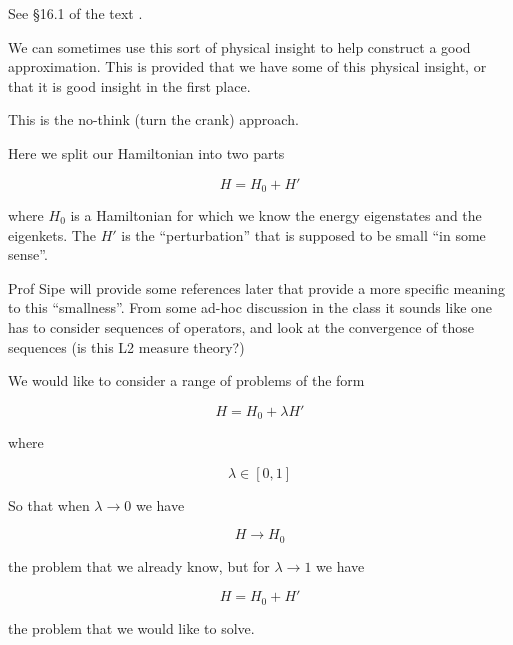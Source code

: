 See \S 16.1 of the text \cite{desai2009quantum}.

We can sometimes use this sort of physical insight to help construct a good approximation.  This is provided that we have some of this physical insight, or that it is good insight in the first place.

This is the no-think (turn the crank) approach.

Here we split our Hamiltonian into two parts

\begin{equation}\label{eqn:qmTwoL3:310}
H = H_0 + H'
\end{equation}

where $H_0$ is a Hamiltonian for which we know the energy eigenstates and the eigenkets.  The $H'$ is the ``perturbation'' that is supposed to be small ``in some sense''.

Prof Sipe will provide some references later that provide a more specific meaning to this ``smallness''.  From some ad-hoc discussion in the class it sounds like one has to consider sequences of operators, and look at the convergence of those sequences (is this L2 measure theory?)


We would like to consider a range of problems of the form

\begin{equation}\label{eqn:qmTwoL3:330}
H = H_0 + \lambda H'
\end{equation}

where

\begin{equation}\label{eqn:qmTwoL3:350}
\lambda \in [0,1]
\end{equation}

So that when $\lambda \rightarrow 0$ we have

\begin{equation}\label{eqn:qmTwoL3:370}
H \rightarrow H_0
\end{equation}

the problem that we already know, but for $\lambda \rightarrow 1$ we have

\begin{equation}\label{eqn:qmTwoL3:390}
H = H_0 + H'
\end{equation}

the problem that we would like to solve.

